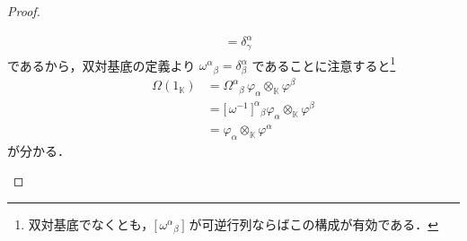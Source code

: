 \documentclass[TQFT_main]{subfiles}
\begin{document}
\begin{proof}
\begin{enumerate}
\begin{align}
            &= \delta_\gamma^\alpha
        \end{align}
        であるから，双対基底の定義より $\omega^\alpha{}_\beta = \delta^{\alpha}_\beta$ であることに注意すると\footnote{双対基底でなくとも，$\bigl[\, \omega^{\alpha}{}_\beta \,\bigr]$ が可逆行列ならばこの構成が有効である．}
        \begin{align}
            \Omega(1_{\mathbb{K}}) 
            &= \Omega^\alpha{}_\beta\, \varphi_\alpha \otimes_{\mathbb{K}} \varphi^\beta  \\
            &= \bigl[\,\omega^{-1}\,\bigr]^\alpha{}_\beta \varphi_\alpha \otimes_{\mathbb{K}} \varphi^\beta \\
            &= \varphi_\alpha \otimes_{\mathbb{K}} \varphi^\alpha
        \end{align}
        が分かる．
    \end{enumerate}
    
\end{proof}
\end{document}
